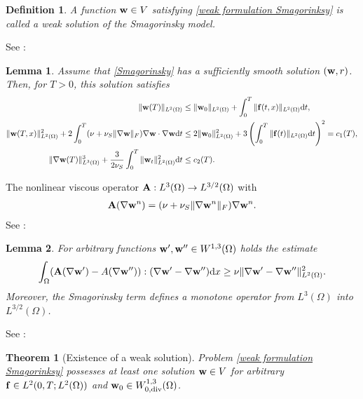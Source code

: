 \documentclass[oneside,11pt]{book}
\numberwithin{equation}{section}
\newtheorem{lemma}{Lemma}[section]
\newtheorem{definition}{Definition}[section]
\newtheorem{theorem}{Theorem}[section]
\begin{document}
\begin{definition}
    A function ${\bf w}\in V$ satisfying \eqref{weak formulation Smagorinksy} is called a \emph{weak solution} of the Smagorinsky model.
\end{definition}
See \cite[Lemmas 6.1, 6.2 and 6.3, pp. 75--76]{John2004}:
\begin{lemma}
    Assume that \eqref{Smagorinsky} has a sufficiently smooth solution $({\bf w},r)$. Then, for $T > 0$, this solution satisfies
    \begin{align*}
        \|{\bf w}(T)\|_{L^2(\Omega)}&\le\|{\bf w}_0\|_{L^2(\Omega)} + \int_0^T \|{\bf f}(t,x)\|_{L^2(\Omega)}{\rm d}t,\\
        \|{\bf w}(T,x)\|_{L^2(\Omega)}^2 + 2\int_0^T (\nu + \nu_S\|\nabla{\bf w}\|_F)\nabla{\bf w}\cdot\nabla{\bf w}{\rm d}t&\le 2\|{\bf w}_0\|_{L^2(\Omega)}^2 + 3\left(\int_0^T \|{\bf f}(t)\|_{L^2(\Omega)}{\rm d}t\right)^2 = c_1(T),\\
        \|\nabla{\bf w}(T)\|_{L^3(\Omega)}^3 + \frac{3}{2\nu_S}\int_0^T \|{\bf w}_t\|_{L^2(\Omega)}^2{\rm d}t&\le c_2(T).
    \end{align*}
\end{lemma}
The nonlinear viscous operator ${\bf A}: L^3(\Omega)\to L^{3/2}(\Omega)$ with
\begin{align*}
    {\bf A}(\nabla{\bf w}^n) = (\nu + \nu_S\|\nabla{\bf w}^n\|_F)\nabla{\bf w}^n. 
\end{align*}
See \cite[Lemma 6.9, pp. 85]{John2004}:
\begin{lemma}
    For arbitrary functions ${\bf w}',{\bf w}''\in W^{1,3}(\Omega)$ holds the estimate
    \begin{align}
        \int_\Omega ({\bf A}(\nabla{\bf w}') - A(\nabla{\bf w}'')):(\nabla{\bf w}' - \nabla{\bf w}''){\rm d}x\ge\nu\|\nabla{\bf w}' - \nabla{\bf w}''\|_{L^2(\Omega)}^2.
    \end{align}
    Moreover, the Smagorinsky term defines a monotone operator from $L^3(\Omega)$ into $L^{3/2}(\Omega)$.
\end{lemma}
See \cite[Theorem 6.12, p. 89]{John2004}:
\begin{theorem}[Existence of a weak solution]
    Problem \eqref{weak formulation Smagorinksy} possesses at least one solution ${\bf w}\in V$ for arbitrary ${\bf f}\in L^2(0,T;L^2(\Omega))$ and ${\bf w}_0\in W_{0,{\rm div}}^{1,3}(\Omega)$.
\end{theorem}
\end{document}
